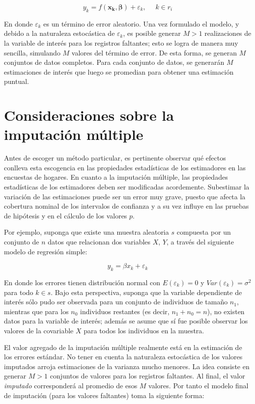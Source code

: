 \documentclass[
  12pt,
]{book}
\begin{document}
\[
y_k = f(\mathbf{x_k},\boldsymbol{\beta}) + \varepsilon_k, \ \ \ \ \ \ k\in r_i
\]

En donde \(\varepsilon_k\) es un término de error aleatorio. Una vez formulado el modelo, y debido a la naturaleza estocástica de \(\varepsilon_k\), es posible generar \(M>1\) realizaciones de la variable de interés para los registros faltantes; esto se logra de manera muy sencilla, simulando \(M\) valores del término de error. De esta forma, se generan \(M\) conjuntos de datos completos. Para cada conjunto de datos, se generarán \(M\) estimaciones de interés que luego se promedian para obtener una estimación puntual.

\hypertarget{consideraciones-sobre-la-imputaciuxf3n-muxfaltiple}{%
\section{Consideraciones sobre la imputación múltiple}\label{consideraciones-sobre-la-imputaciuxf3n-muxfaltiple}}

Antes de escoger un método particular, es pertinente observar qué efectos conlleva esta escogencia en las propiedades estadísticas de los estimadores en las encuestas de hogares. En cuanto a la imputación múltiple, las propiedades estadísticas de los estimadores deben ser modificadas acordemente. Subestimar la variación de las estimaciones puede ser un error muy grave, puesto que afecta la cobertura nominal de los intervalos de confianza y a su vez influye en las pruebas de hipótesis y en el cálculo de los valores \(p\).

Por ejemplo, suponga que existe una muestra aleatoria \(s\) compuesta por un conjunto de \(n\) datos que relacionan dos variables \(X\), \(Y\), a través del siguiente modelo de regresión simple:

\[
y_k = \beta x_k + \varepsilon_k
\]

En donde los errores tienen distribución normal con \(E(\varepsilon_k) = 0\) y \(Var(\varepsilon_k) = \sigma ^2\) para todo \(k\in s\). Bajo esta perspectiva, suponga que la variable dependiente de interés sólo pudo ser observada para un conjunto de individuos de tamaño \(n_1\), mientras que para los \(n_0\) individuos restantes (es decir, \(n_1 + n_0 = n\)), no existen datos para la variable de interés; además se asume que sí fue posible observar los valores de la covariable \(X\) para todos los individuos en la muestra.

El valor agregado de la imputación múltiple \citep{Rubin_1987} realmente está en la estimación de los errores estándar. No tener en cuenta la naturaleza estocástica de los valores imputados arroja estimaciones de la varianza mucho menores. La idea consiste en generar \(M > 1\) conjuntos de valores para los registros faltantes. Al final, el valor \emph{imputado} corresponderá al promedio de esos \(M\) valores. Por tanto el modelo final de imputación (para los valores faltantes) toma la siguiente forma:
\end{document}
